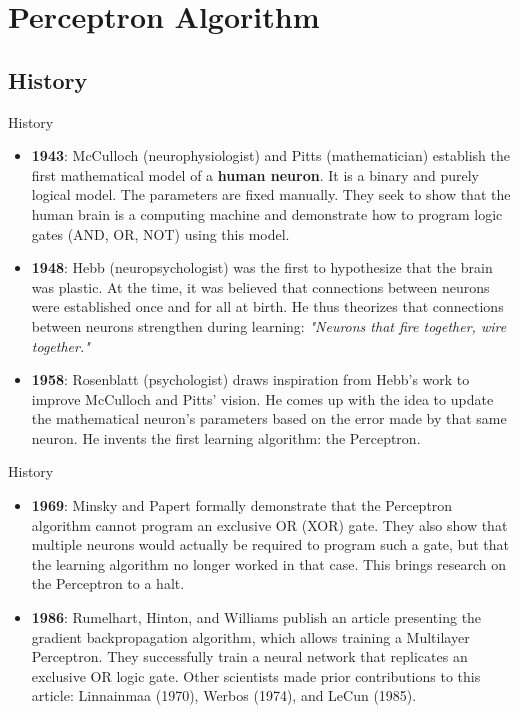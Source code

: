 \section[Perceptron Algorithm]{Perceptron Algorithm}

\subsection[History]{History}

\begin{frame}{History}
	\begin{itemize}
		\item \textbf{1943}: McCulloch (neurophysiologist) and Pitts (mathematician) establish the first mathematical model of a \textbf{human neuron}. It is a binary and purely logical model. The parameters are fixed manually. They seek to show that the human brain is a computing machine and demonstrate how to program logic gates (AND, OR, NOT) using this model.
		\pause
		\item \textbf{1948}: Hebb (neuropsychologist) was the first to hypothesize that the brain was plastic. At the time, it was believed that connections between neurons were established once and for all at birth. He thus theorizes that connections between neurons strengthen during learning: \textit{"Neurons that fire together, wire together."}
		\item \textbf{1958}: Rosenblatt (psychologist) draws inspiration from Hebb's work to improve McCulloch and Pitts' vision. He comes up with the idea to update the mathematical neuron's parameters based on the error made by that same neuron. He invents the first learning algorithm: the Perceptron.
	\end{itemize}
\end{frame}

\begin{frame}{History}
	\begin{itemize}
		\item \textbf{1969}: Minsky and Papert formally demonstrate that the Perceptron algorithm cannot program an exclusive OR (XOR) gate. They also show that multiple neurons would actually be required to program such a gate, but that the learning algorithm no longer worked in that case. This brings research on the Perceptron to a halt.
		\pause 
		\item \textbf{1986}: Rumelhart, Hinton, and Williams publish an article presenting the gradient backpropagation algorithm, which allows training a Multilayer Perceptron. They successfully train a neural network that replicates an exclusive OR logic gate. Other scientists made prior contributions to this article: Linnainmaa (1970), Werbos (1974), and LeCun (1985).
	\end{itemize}
\end{frame}

